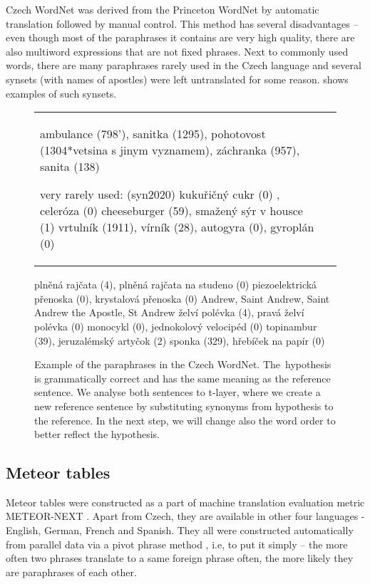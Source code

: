 Czech WordNet was derived from the Princeton WordNet \citep{wordnet,fellbaum98wordnet} by automatic translation followed by manual control. 
This method has several disadvantages \citep{1489838} -- even though most of the paraphrases it contains are very high quality, there are also multiword expressions that are not fixed phrases. Next to commonly used words, there are many  paraphrases rarely used in the Czech language and several synsets 
(with names of apostles) were left untranslated for some reason.
 shows examples of such synsets.

\begin{figure*}[tb]
\begin{center}

 \begin{tabular}{ll}
ambulance (798'), sanitka (1295), pohotovost (1304*vetsina s jinym vyznamem), záchranka (957), sanita (138) 
 
very rarely used: (syn2020)
kukuřičný cukr (0) , celeróza (0) 
cheeseburger (59), smažený sýr v housce (1) 
vrtulník (1911), vírník (28), autogyra (0), gyroplán (0)
\end{tabular}

plněná rajčata (4), plněná rajčata na studeno (0)
piezoelektrická přenoska (0), krystalová přenoska (0)
Andrew, Saint Andrew, Saint Andrew the Apostle, St Andrew
želví polévka (4), pravá želví polévka (0) 
monocykl (0), jednokolový velocipéd (0)
topinambur (39), jeruzalémský artyčok (2)
sponka (329), hřebíček na papír (0) 

\caption{Example of the paraphrases in the Czech WordNet. The~hypothesis is grammatically correct 
and has the same meaning as the reference sentence. We analyse both 
sentences to t-layer, where we create a new reference sentence by substituting
synonyms from hypothesis to the reference. In the next step, we will change also
the word order to better reflect the hypothesis.}
\label{divny_wordnet}
\end{center}
\end{figure*}

 
\subsection{Meteor tables} %
\label{meteori}
Meteor tables were constructed as a part of machine translation evaluation metric METEOR-NEXT \citep{meteor-tables}. 
Apart from Czech, they are available in other four languages - English, German, French and Spanish. 
They all were constructed automatically from parallel data via a pivot phrase method \citep{pivoting}, i.e, to put it simply --  
the more often two phrases translate to a same foreign phrase often, the more likely they are paraphrases of each other.

